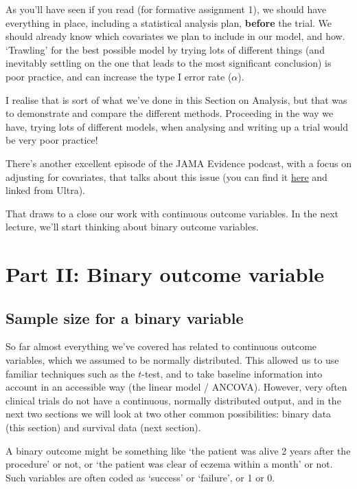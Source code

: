 \documentclass[
  openany]{book}
\theoremstyle{definition}
\theoremstyle{definition}
\theoremstyle{definition}
\theoremstyle{definition}
\theoremstyle{remark}
\begin{document}
As you'll have seen if you read \citet{kendall2003designing} (for formative assignment 1), we should have everything in place, including a statistical analysis plan, \textbf{before} the trial. We should already know which covariates we plan to include in our model, and how. `Trawling' for the best possible model by trying lots of different things (and inevitably settling on the one that leads to the most significant conclusion) is poor practice, and can increase the type I error rate (\(\alpha\)).

I realise that is sort of what we've done in this Section on Analysis, but that was to demonstrate and compare the different methods. Proceeding in the way we have, trying lots of different models, when analysing and writing up a trial would be very poor practice!

There's another excellent episode of the JAMA Evidence podcast, with a focus on adjusting for covariates, that talks about this issue (you can find it \href{https://edhub.ama-assn.org/jn-learning/audio-player/18836864}{here} and linked from Ultra).

That draws to a close our work with continuous outcome variables. In the next lecture, we'll start thinking about binary outcome variables.

\hypertarget{part-part-ii-binary-outcome-variable}{%
\part{Part II: Binary outcome variable}\label{part-part-ii-binary-outcome-variable}}

\hypertarget{ss-bin}{%
\chapter{Sample size for a binary variable}\label{ss-bin}}

So far almost everything we've covered has related to continuous outcome variables, which we assumed to be normally distributed. This allowed us to use familiar techniques such as the \(t\)-test, and to take baseline information into account in an accessible way (the linear model / ANCOVA). However, very often clinical trials do not have a continuous, normally distributed output, and in the next two sections we will look at two other common possibilities: binary data (this section) and survival data (next section).

A binary outcome might be something like `the patient was alive 2 years after the procedure' or not, or `the patient was clear of eczema within a month' or not. Such variables are often coded as `success' or `failure', or 1 or 0.
\end{document}
